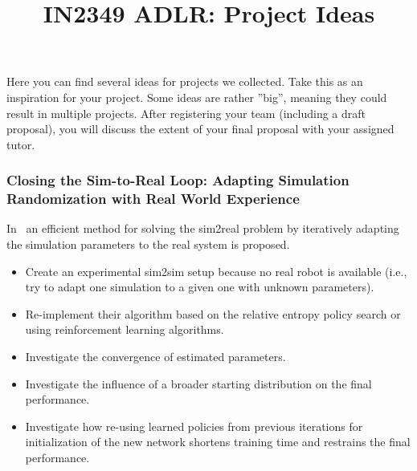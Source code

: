 \documentclass[a4paper]{article}
\title{IN2349 ADLR: Project Ideas}
\author{}
\begin{document}
\maketitle

Here you can find several ideas for projects we collected.
Take this as an inspiration for your project.
Some ideas are rather ”big”, meaning they could result in multiple projects.
After registering your team (including a draft proposal), you will discuss the extent of your final proposal with your assigned tutor.

\subsubsection{Closing the Sim-to-Real Loop: Adapting Simulation Randomization with Real World Experience}
In~\citet{Chebotar2018} an efficient method for solving the sim2real problem by iteratively adapting the simulation parameters to the real system is proposed.
\begin{itemize}
  \item Create an experimental sim2sim setup because no real robot is available (i.e., try to adapt one simulation to a given one with unknown parameters).
  \item Re-implement their algorithm based on the relative entropy policy search or using reinforcement learning algorithms.
  \item Investigate the convergence of estimated parameters.
  \item Investigate the influence of a broader starting distribution on the final performance.
  \item Investigate how re-using learned policies from previous iterations for initialization of the new network shortens training time and restrains the final performance.
\end{itemize}

\end{document}
